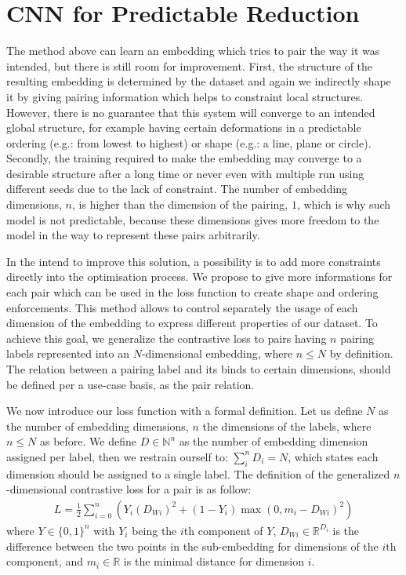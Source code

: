 \documentclass[a4paper,12pt]{report}
\newcommand{\N}{\mathbb{N}}
\newcommand{\R}{\mathbb{R}}
\newcommand{\eg}{e.g.}
\begin{document}
\section{CNN for Predictable Reduction}
The method above can learn an embedding which tries to pair the way it was intended, but there is still room for improvement.
First, the structure of the resulting embedding is determined by the dataset and again we indirectly shape it by giving pairing information which helps to constraint local structures.
However, there is no guarantee that this system will converge to an intended global structure, for example having certain deformations in a predictable ordering (\eg: from lowest to highest) or shape (\eg: a line, plane or circle).
Secondly, the training required to make the embedding may converge to a desirable structure after a long time or never even with multiple run using different seeds due to the lack of constraint.
The number of embedding dimensions, $n$, is higher than the dimension of the pairing, $1$, which is why such model is not predictable, because these dimensions gives more freedom to the model in the way to represent these pairs arbitrarily.

In the intend to improve this solution, a possibility is to add more constraints directly into the optimisation process.
We propose to give more informations for each pair which can be used in the loss function to create shape and ordering enforcements.
This method allows to control separately the usage of each dimension of the embedding to express different properties of our dataset.
To achieve this goal, we generalize the contrastive loss to pairs having $n$ pairing labels represented into an $N$-dimensional embedding, where $n \leq N$ by definition.
The relation between a pairing label and its binds to certain dimensions, should be defined per a use-case basis, as the pair relation.

We now introduce our loss function with a formal definition.
Let us define $N$ as the number of embedding dimensions, $n$ the dimensions of the labels, where $n \leq N$ as before.
We define $D \in \N^n$ as the number of embedding dimension assigned per label, then we restrain ourself to: $\sum_i^n D_i = N$, which states each dimension should be assigned to a single label.
The definition of the generalized $n$-dimensional contrastive loss for a pair is as follow:
\begin{eqnarray}
    L = \frac{1}{2} \sum_{i=0}^n \left( Y_i (D_{Wi})^2 + (1-Y_i) \max(0, m_i - D_{Wi})^2 \right)
\end{eqnarray}
where $Y \in \{0,1\}^n$ with $Y_i$ being the $i$th component of $Y$, $D_{Wi} \in \R^{D_i}$ is the difference between the two points in the sub-embedding for dimensions of the $i$th component, and $m_i \in \R$ is the minimal distance for dimension $i$.
\end{document}
